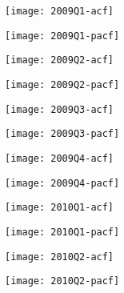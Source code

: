 \begin{figure}[htp]
	\centering
	\begin{subfigure}{0.23\textwidth}
		\centering
		\texttt{[image: 2009Q1-acf]}
	\end{subfigure}
	\begin{subfigure}{0.23\textwidth}
		\centering
		\texttt{[image: 2009Q1-pacf]}
	\end{subfigure}
	\begin{subfigure}{0.23\textwidth}
		\centering
		\texttt{[image: 2009Q2-acf]}
	\end{subfigure}
	\begin{subfigure}{0.23\textwidth}
		\centering
		\texttt{[image: 2009Q2-pacf]}
	\end{subfigure}
\end{figure}

\begin{figure}[htp]
	\centering
	\begin{subfigure}{0.23\textwidth}
		\centering
		\texttt{[image: 2009Q3-acf]}
	\end{subfigure}
	\begin{subfigure}{0.23\textwidth}
		\centering
		\texttt{[image: 2009Q3-pacf]}
	\end{subfigure}
	\begin{subfigure}{0.23\textwidth}
		\centering
		\texttt{[image: 2009Q4-acf]}
	\end{subfigure}
	\begin{subfigure}{0.23\textwidth}
		\centering
		\texttt{[image: 2009Q4-pacf]}
	\end{subfigure}
\end{figure}



\begin{figure}[htp]
	\centering
	\begin{subfigure}{0.23\textwidth}
		\centering
		\texttt{[image: 2010Q1-acf]}
	\end{subfigure}
	\begin{subfigure}{0.23\textwidth}
		\centering
		\texttt{[image: 2010Q1-pacf]}
	\end{subfigure}
	\begin{subfigure}{0.23\textwidth}
		\centering
		\texttt{[image: 2010Q2-acf]}
	\end{subfigure}
	\begin{subfigure}{0.23\textwidth}
		\centering
		\texttt{[image: 2010Q2-pacf]}
	\end{subfigure}
\end{figure}

